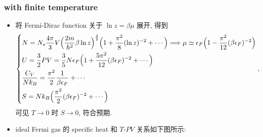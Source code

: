 \subsubsection{with finite temperature}
\begin{itemize}
	\item 将 Fermi-Dirac function 关于 $\ln z = \beta \mu$ 展开, 得到
	\begin{equation} \label{8.1.10}
		\begin{dcases}
			N = N_s \frac{4 \pi}{3} V \Big( \frac{2 m}{h^2} \beta \ln z \Big)^{\frac{3}{2}} \Big( 1 + \frac{\pi^2}{8} (\ln z)^{- 2} + \cdots \Big) \Longrightarrow \mu \simeq \epsilon_F \Big( 1 - \frac{\pi^2}{12} (\beta \epsilon_F)^{- 2} \Big) \\
			U = \frac{3}{2} P V = \frac{3}{5} N \epsilon_F \Big( 1 + \frac{5 \pi^2}{12} (\beta \epsilon_F)^{- 2} + \cdots \Big) \\
			\frac{C_V}{N k_B} = \frac{\pi^2}{2} \frac{1}{\beta \epsilon_F} + \cdots \\
			S = N k_B \Big( \frac{\pi^2}{2} (\beta \epsilon_F)^{- 2} + 
			\cdots \Big)
		\end{dcases},
	\end{equation}
	可见 $T \rightarrow 0$ 时 $S \rightarrow 0$, 符合预期.
	
	\item ideal Fermi gas 的 specific heat 和 $T$-$P V$ 关系如下图所示:
	

\end{itemize}
